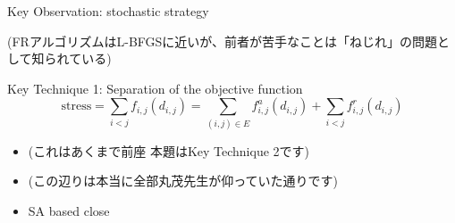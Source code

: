 \documentclass[13pt,aspectratio=169,table,dvipdfmx]{beamer}
\newif\ifShowHidden
\begin{document}
\begin{frame}{Key Observation: stochastic strategy}
\begin{figure}[htbp]
    \end{figure}
    \textcolor{cE}{\small{(FRアルゴリズムはL-BFGSに近いが、前者が苦手なことは「ねじれ」の問題として知られている)}}
\end{frame}

\begin{frame}{Key Technique 1: Separation of the objective function}
    \begin{equation*}
        \mathrm{stress} = \sum_{i<j} f_{i,j}(d_{i,j}) = \sum_{(i,j)\in E} f^a_{i,j}(d_{i,j}) + \sum_{i<j} f^r_{i,j}(d_{i,j})
    \end{equation*}
    \begin{itemize}
        \item \textcolor{cE}{(これはあくまで前座 本題はKey Technique 2です)}
        \item \textcolor{cE}{(この辺りは本当に全部丸茂先生が仰っていた通りです)}
        \item SA based close
    \end{itemize}
\end{frame}

\ifShowHidden
    \begin{frame}{Key Observation: stochastic strategy}
        \begin{itemize}
            \item これはTSPを部分問題として含む
                  \begin{itemize}
                      \item 代表的なTSPの解法: (Held-Karp), 2-opt, 3-opt, Lin-Kernighan, Christofides, etc.
                      \item 参考になる部分とならない部分がそれぞれある。
                  \end{itemize}
        \end{itemize}
    \end{frame}
\fi
\end{document}
